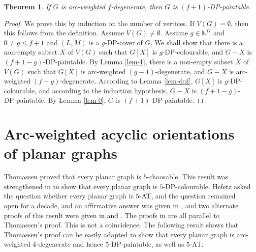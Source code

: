 \documentclass[11pt,a4paper]{article}
\newtheorem{theorem}{Theorem}
\theoremstyle{definition}
\begin{document}
  

\begin{theorem}
\label{thm-DP}
If $G$ is arc-weighted  $f$-degenerate, then $G$ is   $(f+1)$-DP-paintable.  
\end{theorem}
\begin{proof}
  We prove this by induction on the number of vertices. If $V(G)=\emptyset$, then this follows from the definition.
    Assume $V(G) \ne \emptyset$. Assume $g \in \mathbb{N}^G$ and $0 \ne g \le f+1$ and $(L,M)$ is a $g$-DP-cover of $G$. We shall show that there is a non-empty subset $X$ of $V(G)$ such that $G[X]$ is $g$-DP-colourable, and $G-X$ is $(f+1-g)$-DP-paintable.  
   By Lemma \ref{lem-1},  there is a non-empty subset $X$ of $V(G)$ such that $G[X]$ is arc-weighted  $(g-1)$-degenerate, and $G-X$ is arc-weighted  $(f-g)$-degenerate. According 
to Lemma \ref{lem-dpf}, 
    $G[X]$ is $g$-DP-colourable, and according to the induction hypothesis, $G-X$ is $(f+1-g)$-DP-paintable. By Lemma \ref{lem-0}, $G$ is $(f+1)$-DP-paintable.
\end{proof}

  


\section{Arc-weighted acyclic orientations of planar graphs}
\label{degree-truncated}

Thomassen \cite{Thomassen} proved that every planar graph is $5$-choosable. 
This result was strengthened in \cite{DP} to show that every planar graph is $5$-DP-colourable.
Hefetz \cite{Hefetz} asked the question whether every planar graph is $5$-AT, and the question remained open for a decade, and 
an affirmative answer was given in \cite{Zhu5AT}, and two alternate proofs of this result were given in \cite{GZ} and \cite{kozik}. The proofs in \cite{DP,Zhu5AT,GZ,kozik} are all parallel to Thomassen's proof. This is not a coincidence. The following result shows that Thomassen's proof can be easily adapted to show 
 that every planar graph is arc-weighted $4$-degenerate and hence $5$-DP-paintable, as well as $5$-AT.
\end{document}
